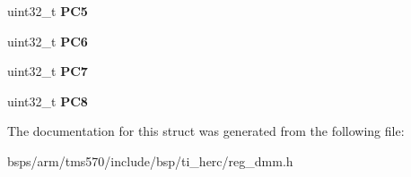 \begin{DoxyCompactItemize}
uint32\+\_\+t {\bfseries P\+C5}
\item 
\mbox{\label{structtms570__dmm__t_aa5cec675ea0e50bc034fdc9348b0ebe8}} 
uint32\+\_\+t {\bfseries P\+C6}
\item 
\mbox{\label{structtms570__dmm__t_a5dffb383786f0f9d57efa14096028361}} 
uint32\+\_\+t {\bfseries P\+C7}
\item 
\mbox{\label{structtms570__dmm__t_aaee0b7544a93e9dede7a6495fa0fa0f8}} 
uint32\+\_\+t {\bfseries P\+C8}
\end{DoxyCompactItemize}


The documentation for this struct was generated from the following file\+:\begin{DoxyCompactItemize}
\item 
bsps/arm/tms570/include/bsp/ti\+\_\+herc/reg\+\_\+dmm.\+h\end{DoxyCompactItemize}
